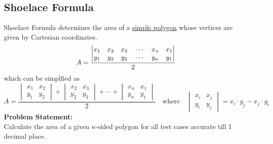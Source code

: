 \subsection{Shoelace Formula}
Shoelace Formula determines the area of a \href{https://en.wikipedia.org/wiki/Simple_polygon}{simple polygon} whose vertices are given by Cartesian coordinates.
\begin{equation}{\label{eq:shoelace}}
A = \frac{{\begin{vmatrix}x_{1}&x_{2}&x_{3}\quad\cdots &x_{n}&x_{1}\\y_{1}&y_{2}&y_{3}\quad \cdots &y_{n}&y_{1}\end{vmatrix}}}{2}
\end{equation}
which can be simplfied as
\begin{equation*}
A = \frac{{\begin{vmatrix}x_{1}&x_{2}\\y_{1}&y_{2}\end{vmatrix}}+{\begin{vmatrix}x_{2}&x_{3}\\y_{2}&y_{3}\end{vmatrix}}+\cdots +{\begin{vmatrix}x_{n}&x_{1}\\y_{n}&y_{1}\end{vmatrix}}}{2}\quad\text{where}\quad
\begin{vmatrix}x_{i}&x_{j}\\y_{i}&y_{j}\end{vmatrix} = x_i\cdot y_j - x_j\cdot y_i
\end{equation*}
\textbf{Problem Statement:}\\
Calculate the area of a given $n$-sided polygon for all test cases accurate till 1 decimal place.

